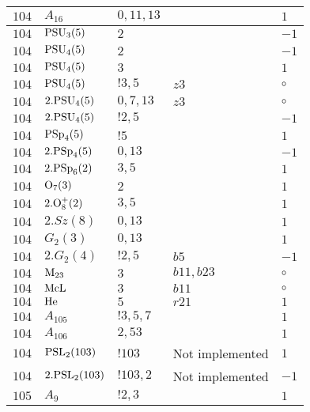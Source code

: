 \documentclass[a4paper, 11pt]{article}
\begin{document}
\begin{longtable}{lllll}
        $ 104 $ & $ A_{16} $ & $ 0,11,13 $ & $ ~ $ & $ 1$ \\ \hline
        $ 104 $ & $ {\rm PSU}_{3}(5) $ & $ 2 $ & $ ~ $ & $ -1$ \\ \hline
        $ 104 $ & $ {\rm PSU}_{4}(5) $ & $ 2 $ & $ ~ $ & $ -1$ \\ \hline
        $ 104 $ & $ {\rm PSU}_{4}(5) $ & $ 3 $ & $ ~ $ & $ 1$ \\ \hline
        $ 104 $ & $ {\rm PSU}_{4}(5) $ & $ ! 3,5 $ & $ z3 $ &  $\circ$ \\ \hline
        $ 104 $ & $ 2.{\rm PSU}_{4}(5) $ & $ 0,7,13 $ & $ z3 $ &  $\circ$ \\ \hline
        $ 104 $ & $ 2.{\rm PSU}_{4}(5) $ & $ ! 2,5 $ & $ ~ $ & $ -1$ \\ \hline
        $ 104 $ & $ {\rm PSp}_{4}(5) $ & $ ! 5 $ & $ ~ $ & $ 1$ \\ \hline
        $ 104 $ & $ 2.{\rm PSp}_{4}(5) $ & $ 0,13 $ & $ ~ $ & $ -1$ \\ \hline
        $ 104 $ & $ 2.{\rm PSp}_{6}(2) $ & $ 3, 5 $ & $ ~ $ & $ 1$ \\ \hline
        $ 104 $ & $ {\rm O}_{7}(3) $ & $ 2 $ & $ ~ $ & $ 1$ \\ \hline
        $ 104 $ & $ 2.{\rm O}_{8}^+(2) $ & $ 3, 5 $ & $ ~ $ & $ 1$ \\ \hline
        $ 104 $ & $ 2.Sz(8) $ & $ 0,13 $ & $ ~ $ & $ 1$ \\ \hline
        $ 104 $ & $ G_{2}(3) $ & $ 0,13 $ & $ ~ $ & $ 1$ \\ \hline
        $ 104 $ & $ 2.G_{2}(4) $ & $ ! 2,5 $ & $ b5 $ & $ -1$ \\ \hline
        $ 104 $ & $ {\rm M}_{23} $ & $ 3 $ & $ b11, b23 $ &  $\circ$ \\ \hline
        $ 104 $ & $ {\rm McL} $ & $ 3 $ & $ b11 $ &  $\circ$ \\ \hline
        $ 104 $ & $ {\rm He} $ & $ 5 $ & $ r21 $ & $ 1$ \\ \hline
        $ 104 $ & $ A_{105} $ & $ !3, 5, 7 $ & $ ~ $ & $ 1$ \\ \hline
        $ 104 $ & $ A_{106} $ & $ 2, 53 $ & $ ~ $ & $ 1$ \\ \hline
        $ 104 $ & $ {\rm PSL}_{2}(103) $ & $ !103 $ &  Not implemented & $ 1$ \\ \hline
        $ 104 $ & $ 2.{\rm PSL}_{2}(103) $ & $ !103, 2 $ &  Not implemented & $ -1$ \\ \hline
        $ 105 $ & $ A_{9} $ & $ ! 2,3 $ & $ ~ $ & $ 1$ \\ \hline

\end{longtable}
\end{document}
